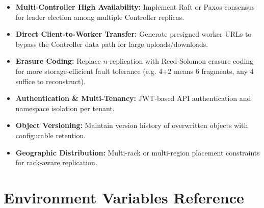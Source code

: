 \documentclass[12pt,a4paper]{report}
\begin{document}
\begin{itemize}
  \item \textbf{Multi-Controller High Availability:} Implement Raft or Paxos consensus for leader election among multiple Controller replicas.
  \item \textbf{Direct Client-to-Worker Transfer:} Generate presigned worker URLs to bypass the Controller data path for large uploads/downloads.
  \item \textbf{Erasure Coding:} Replace $n$-replication with Reed-Solomon erasure coding for more storage-efficient fault tolerance (e.g. 4+2 means 6 fragments, any 4 suffice to reconstruct).
  \item \textbf{Authentication \& Multi-Tenancy:} JWT-based API authentication and namespace isolation per tenant.
  \item \textbf{Object Versioning:} Maintain version history of overwritten objects with configurable retention.
  \item \textbf{Geographic Distribution:} Multi-rack or multi-region placement constraints for rack-aware replication.
\end{itemize}

\appendix

\chapter{Environment Variables Reference}
\end{document}
